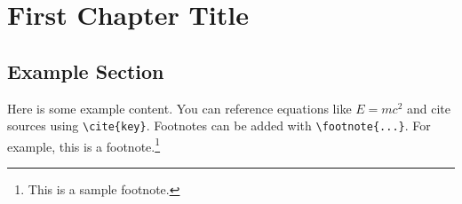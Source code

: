 \documentclass[11pt,oneside]{book} %
\begin{document}
\chapter{First Chapter Title}

\section{Example Section}
Here is some example content. You can reference equations like \(E=mc^2\) and cite sources using \verb|\cite{key}|.  Footnotes can be added with \verb|\footnote{...}|.  For example, this is a footnote.\footnote{This is a sample footnote.}


\backmatter
\printbibliography[heading=bibintoc] %
\end{document}
